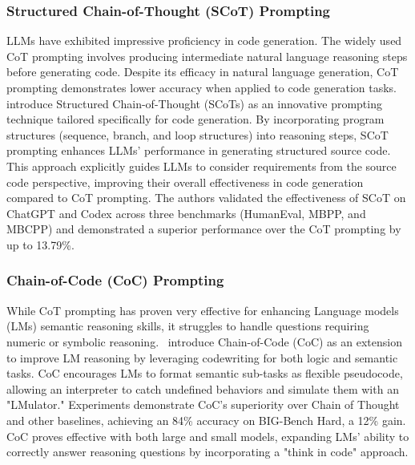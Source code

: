 \documentclass{article}
\begin{document}
\subsubsection{Structured Chain-of-Thought (SCoT) Prompting}
\label{scot}
LLMs have exhibited impressive proficiency in code generation. The widely used CoT prompting involves producing intermediate natural language reasoning steps before generating code. Despite its efficacy in natural language generation, CoT prompting demonstrates lower accuracy when applied to code generation tasks.~\cite{li2023structured} introduce Structured Chain-of-Thought (SCoTs) as an innovative prompting technique tailored specifically for code generation. By incorporating program structures (sequence, branch, and loop structures) into reasoning steps, SCoT prompting enhances LLMs' performance in generating structured source code. This approach explicitly guides LLMs to consider requirements from the source code perspective, improving their overall effectiveness in code generation compared to CoT prompting. The authors validated the effectiveness of SCoT on ChatGPT and Codex across three benchmarks (HumanEval, MBPP, and MBCPP) and demonstrated a superior performance over the CoT prompting by up to 13.79\%.

\subsubsection{Chain-of-Code (CoC) Prompting}
\label{ccp}
While CoT prompting has proven very effective for enhancing Language models (LMs) semantic reasoning skills, it struggles to handle questions requiring numeric or symbolic reasoning.~\cite{li2023chain} introduce Chain-of-Code (CoC) as an extension to improve LM reasoning by leveraging codewriting for both logic and semantic tasks. CoC encourages LMs to format semantic sub-tasks as flexible pseudocode, allowing an interpreter to catch undefined behaviors and simulate them with an "LMulator." Experiments demonstrate CoC's superiority over Chain of Thought and other baselines, achieving an 84\% accuracy on BIG-Bench Hard, a 12\% gain. CoC proves effective with both large and small models, expanding LMs' ability to correctly answer reasoning questions by incorporating a "think in code" approach.
\end{document}
